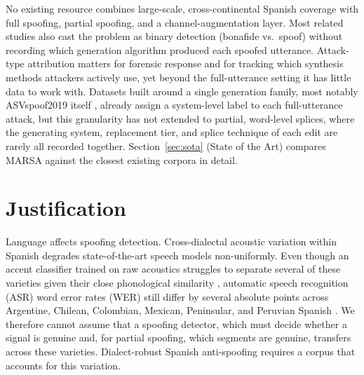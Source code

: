 \documentclass[11pt]{report}
\begin{document}
No existing resource combines large-scale, cross-continental Spanish
coverage with full spoofing, partial spoofing, and a channel-augmentation
layer. Most related studies also cast the problem as binary detection
(bonafide vs.\ spoof) without recording which generation algorithm
produced each spoofed utterance. Attack-type attribution matters for
forensic response and for tracking which synthesis methods attackers
actively use, yet beyond the full-utterance setting it has little data
to work with. Datasets built around a single
generation family, most notably ASVspoof2019 itself
\citep{asvspoof2019}, already assign a system-level label to each
full-utterance attack, but this granularity has not extended to
partial, word-level splices, where the generating system, replacement
tier, and splice technique of each edit are rarely all recorded
together. Section~\ref{sec:sota} (State of the Art) compares MARSA
against the closest existing corpora in detail.

\section{Justification}

Language affects spoofing detection. Cross-dialectal
acoustic variation within Spanish degrades state-of-the-art speech models
non-uniformly. Even though an accent classifier trained on raw acoustics
struggles to separate several of these varieties given their close
phonological similarity \citep{zuluaga2023commonaccent}, automatic speech
recognition (ASR) word error rates (WER) still differ by several absolute
points across Argentine, Chilean, Colombian, Mexican, Peninsular, and
Peruvian Spanish \citep{kantharuban2023dialectgap,nacimiento2024biases}.
We therefore cannot assume that a spoofing
detector, which must decide whether a signal is genuine and, for partial
spoofing, which segments are genuine, transfers across these varieties.
Dialect-robust Spanish anti-spoofing requires a corpus that accounts for
this variation.
\end{document}
